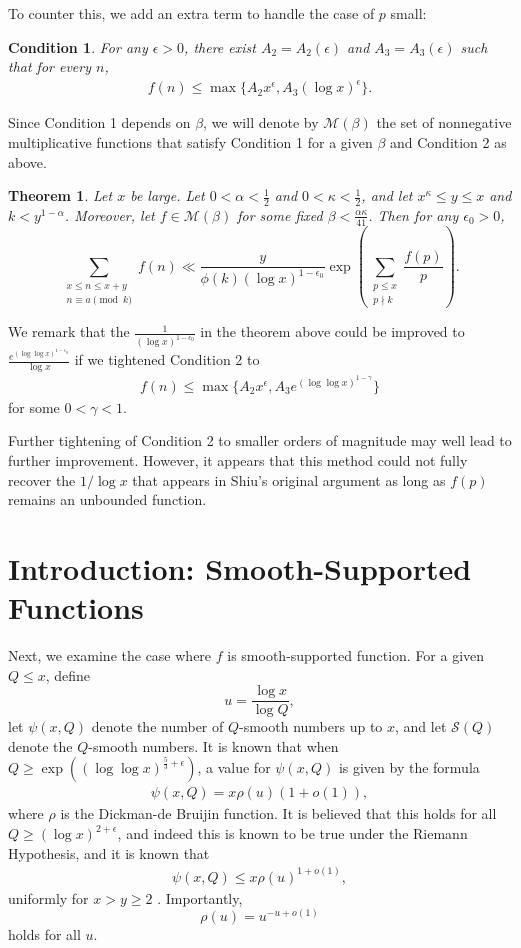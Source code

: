 \documentclass{amsart}
\newtheorem{theorem}{Theorem}[section]
\newtheorem{cond}{Condition}
\begin{document}
To counter this, we add an extra term to handle the case of $p$ small:
\begin{cond}\label{Condition2}
For any $\epsilon>0$, there exist $A_2=A_2(\epsilon)$ and $A_3=A_3(\epsilon)$ such that for every $n$,
\begin{gather}\label{Cond2}
f(n)\leq \max\{A_2 x^\epsilon,A_3(\log x)^\epsilon\}.
\end{gather}
\end{cond}
Since Condition 1 depends on $\beta$, we will denote by $\mathcal M(\beta)$ the set of nonnegative multiplicative functions that satisfy Condition 1 for a given $\beta$ and Condition 2 as above.
\begin{theorem}\label{Maintheorem}
Let $x$ be large.  Let $0<\alpha<\frac 12$ and $0<\kappa<\frac 12$, and let $x^\kappa\leq y\leq x$ and $k<y^{1-\alpha}$.  Moreover, let $f\in \mathcal M(\beta)$ for some fixed $\beta<\frac{\alpha\kappa}{41}$.  Then for any $\epsilon_0>0$,
$$\sum_{\substack{x\leq n\leq x+y \\ n\equiv a\pmod k}}f(n)\ll \frac{y}{\phi(k)(\log x)^{1-\epsilon_0}}\exp\left(\sum_{\substack{p\leq x \\ p\nmid k}}\frac{f(p)}{p}\right).$$
\end{theorem}

We remark that the $\frac{1}{(\log x)^{1-\epsilon_0}}$ in the theorem above could be improved to $\frac{e^{(\log\log x)^{1-\epsilon_0}}}{\log x}$ if we tightened Condition 2 to 
\begin{gather*}
f(n)\leq \max\{A_2 x^\epsilon,A_3e^{(\log\log x)^{1-\gamma}}\}
\end{gather*}
for some $0<\gamma<1$.  


Further tightening of Condition 2 to smaller orders of magnitude may well lead to further improvement.  However, it appears that this method could not fully recover the $1/\log x$ that appears in Shiu's original argument as long as $f(p)$ remains an unbounded function.

\section{Introduction: Smooth-Supported Functions}


Next, we examine the case where $f$ is smooth-supported function.  For a given $Q\leq x$, define
$$u=\frac{\log x}{\log Q},$$
let $\psi(x,Q)$ denote the number of $Q$-smooth numbers up to $x$, and let $\mathcal S(Q)$ denote the $Q$-smooth numbers.  It is known that when $Q\geq \exp\left((\log\log x)^{\frac 53+\epsilon}\right)$, a value for $\psi(x,Q)$ is given by the formula
\begin{gather}\label{Di}\psi(x,Q)=x\rho(u)(1+o(1)),\end{gather}
where $\rho$ is the Dickman-de Bruijin function.  It is believed that this holds for all $Q\geq (\log x)^{2+\epsilon}$, and indeed this is known to be true under the Riemann Hypothesis, and it is known that 
\begin{gather}\label{Di}\psi(x,Q)\leq x\rho(u)^{1+o(1)},\end{gather}
uniformly for $x>y\geq 2$ \cite{Hi}.  Importantly, 
$$\rho(u)=u^{-u+o(1)}$$
holds for all $u$.  
\end{document}
